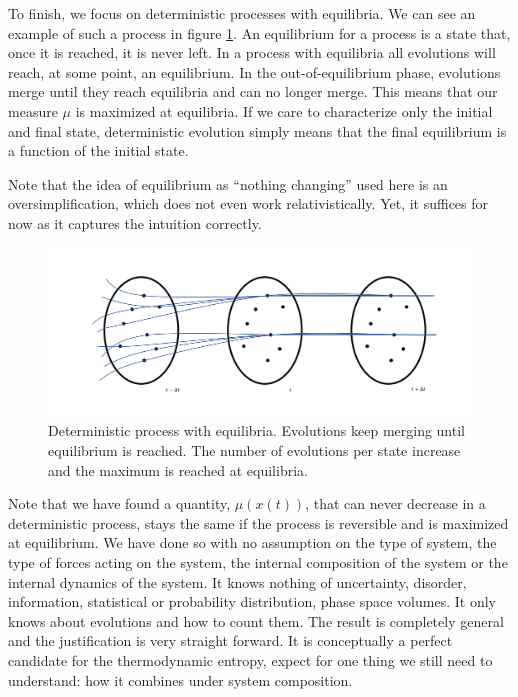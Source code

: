 \documentclass[letterpaper,twocolumn]{article}
\begin{document}
To finish, we focus on deterministic processes with equilibria. We can see an example of such a process in figure \ref{fig_with_equilibria}. An equilibrium for a process is a state that, once it is reached, it is never left. In a process with equilibria all evolutions will reach, at some point, an equilibrium. In the out-of-equilibrium phase, evolutions merge until they reach equilibria and can no longer merge. This means that our measure $\mu$ is maximized at equilibria. If we care to characterize only the initial and final state, deterministic evolution simply means that the final equilibrium is a function of the initial state.

Note that the idea of equilibrium as ``nothing changing'' used here is an oversimplification, which does not even work relativistically. Yet, it suffices for now as it captures the intuition correctly.

\begin{figure}[h]
	\includegraphics[width=\columnwidth]{images/Slide6.png}
	\caption{Deterministic process with equilibria. Evolutions keep merging until equilibrium is reached. The number of evolutions per state increase and the maximum is reached at equilibria.}\label{fig_with_equilibria}
\end{figure}

Note that we have found a quantity, $\mu(x(t))$, that can never decrease in a deterministic process, stays the same if the process is reversible and is maximized at equilibrium. We have done so with no assumption on the type of system, the type of forces acting on the system, the internal composition of the system or the internal dynamics of the system. It knows nothing of uncertainty, disorder, information, statistical or probability distribution, phase space volumes. It only knows about evolutions and how to count them. The result is completely general and the justification is very straight forward. It is conceptually a perfect candidate for the thermodynamic entropy, expect for one thing we still need to understand: how it combines under system composition.
\end{document}
